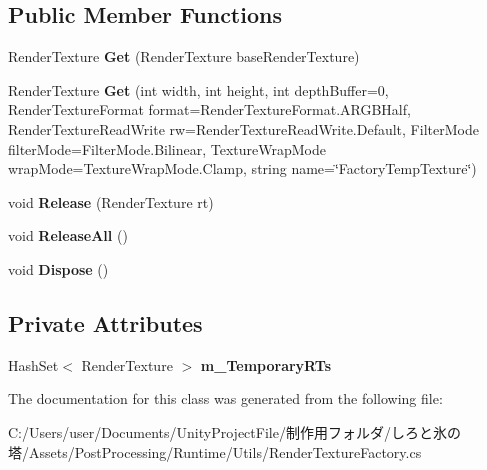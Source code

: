 \subsection*{Public Member Functions}
\begin{DoxyCompactItemize}
\item 
\mbox{\label{class_unity_engine_1_1_post_processing_1_1_render_texture_factory_a66f2ee62b9248b0d50c8c4792b893cbd}} 
Render\+Texture {\bfseries Get} (Render\+Texture base\+Render\+Texture)
\item 
\mbox{\label{class_unity_engine_1_1_post_processing_1_1_render_texture_factory_aaf1c6deb2c4bdc1cc30f9c22243f5ab8}} 
Render\+Texture {\bfseries Get} (int width, int height, int depth\+Buffer=0, Render\+Texture\+Format format=Render\+Texture\+Format.\+A\+R\+G\+B\+Half, Render\+Texture\+Read\+Write rw=Render\+Texture\+Read\+Write.\+Default, Filter\+Mode filter\+Mode=Filter\+Mode.\+Bilinear, Texture\+Wrap\+Mode wrap\+Mode=Texture\+Wrap\+Mode.\+Clamp, string name=\char`\"{}Factory\+Temp\+Texture\char`\"{})
\item 
\mbox{\label{class_unity_engine_1_1_post_processing_1_1_render_texture_factory_a056c901a6186ae99274acbbd099ee76a}} 
void {\bfseries Release} (Render\+Texture rt)
\item 
\mbox{\label{class_unity_engine_1_1_post_processing_1_1_render_texture_factory_a6f5d4a6beda0674159c229f8b3a9a116}} 
void {\bfseries Release\+All} ()
\item 
\mbox{\label{class_unity_engine_1_1_post_processing_1_1_render_texture_factory_aff8e64c17598aa2633a075e3975b0efc}} 
void {\bfseries Dispose} ()
\end{DoxyCompactItemize}
\subsection*{Private Attributes}
\begin{DoxyCompactItemize}
\item 
\mbox{\label{class_unity_engine_1_1_post_processing_1_1_render_texture_factory_a4140f3f51b13ed640264ff4dd0e0caf8}} 
Hash\+Set$<$ Render\+Texture $>$ {\bfseries m\+\_\+\+Temporary\+R\+Ts}
\end{DoxyCompactItemize}


The documentation for this class was generated from the following file\+:\begin{DoxyCompactItemize}
\item 
C\+:/\+Users/user/\+Documents/\+Unity\+Project\+File/制作用フォルダ/しろと氷の塔/\+Assets/\+Post\+Processing/\+Runtime/\+Utils/Render\+Texture\+Factory.\+cs\end{DoxyCompactItemize}
